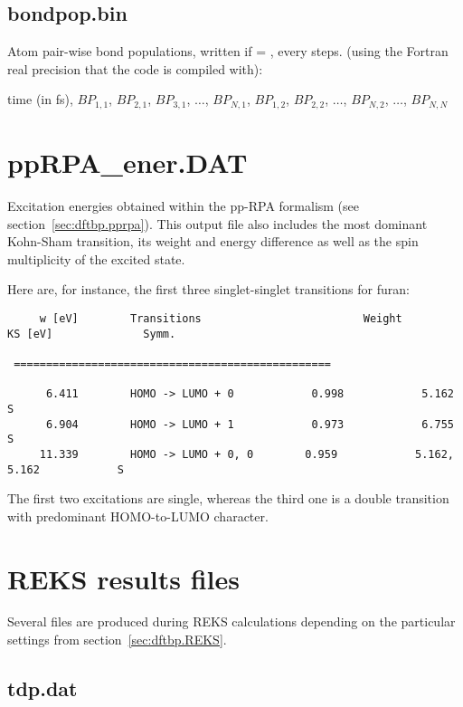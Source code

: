 \subsection{bondpop.bin}
\label{sec:bpformatout}

Atom pair-wise bond populations, written if  = ,
every  steps. (using the Fortran real precision that the code
is compiled with):

time (in fs), $BP_{1,1}$, $BP_{2,1}$, $BP_{3,1}$, $\dots$, $BP_{N,1}$,
$BP_{1,2}$, $BP_{2,2}$, $\dots$, $BP_{N,2}$, $\dots$, $BP_{N,N}$


\section{ppRPA\_ener.DAT}
\label{sec:ppRPAout}

Excitation energies obtained within the pp-RPA formalism (see
section~\ref{sec:dftbp.pprpa}). This output file also includes the
most dominant Kohn-Sham transition, its weight and energy difference
as well as the spin multiplicity of the excited state.

Here are, for instance, the first three singlet-singlet transitions
for furan:

\begin{verbatim}
     w [eV]        Transitions                         Weight            KS [eV]              Symm.

 =================================================

      6.411        HOMO -> LUMO + 0            0.998            5.162                     S
      6.904        HOMO -> LUMO + 1            0.973            6.755                     S
     11.339        HOMO -> LUMO + 0, 0        0.959            5.162,  5.162            S
\end{verbatim}

The first two excitations are single, whereas the third one is a
double transition with predominant HOMO-to-LUMO character.

\section{REKS results files}
\label{sec:reks_files}
Several files are produced during REKS calculations depending on the
particular settings from section~\ref{sec:dftbp.REKS}.


\subsection{tdp.dat}

